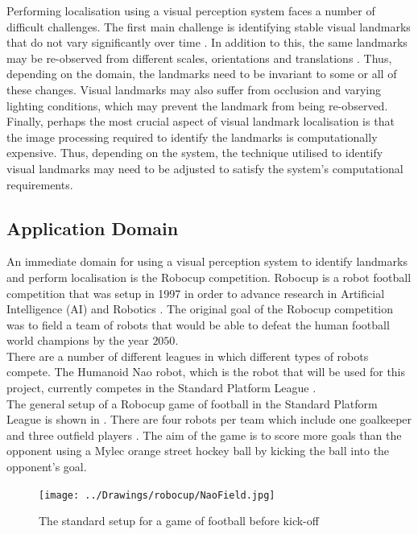 \documentclass[11pt]{report}
\begin{document}
Performing localisation using a visual perception system faces a number of difficult challenges. The first main challenge is identifying stable visual landmarks that do not vary significantly over time \cite{Davison2007, Se2002}. In addition to this, the same landmarks may be re-observed from different scales, orientations and translations \cite{Szeliski2010}. Thus, depending on the domain, the landmarks need to be invariant to some or all of these changes. Visual landmarks may also suffer from occlusion and varying lighting conditions, which may prevent the landmark from being re-observed. Finally, perhaps the most crucial aspect of visual landmark localisation is that the image processing required to identify the landmarks is computationally expensive. Thus, depending on the system, the technique utilised to identify visual landmarks may need to be adjusted to satisfy the system's computational requirements. \\

\subsection{Application Domain}
\label{sec:domain}
An immediate domain for using a visual perception system to identify landmarks and perform localisation is the Robocup competition. Robocup is a robot football competition that was setup in 1997 in order to advance research in Artificial Intelligence (AI) and Robotics \cite{Robocup}. The original goal of the Robocup competition was to field a team of robots that would be able to defeat the human football world champions by the year $2050$.\\

There are a number of different leagues in which different types of robots compete. The Humanoid Nao robot, which is the robot that will be used for this project, currently competes in the Standard Platform League \cite{StandardPlatform}.\\

The general setup of a Robocup game of football in the Standard Platform League is shown in . There are four robots per team which include one goalkeeper and three outfield players \cite{Rules}. The aim of the game is to score more goals than the opponent using a Mylec orange street hockey ball by kicking the ball into the opponent's goal.\\

\begin{figure}[h!] 
  \centering
    \texttt{[image: ../Drawings/robocup/NaoField.jpg]}
    \caption{The standard setup for a game of football before kick-off \cite{Rules}}
    \label{fig:naofield}
\end{figure}
\end{document}
